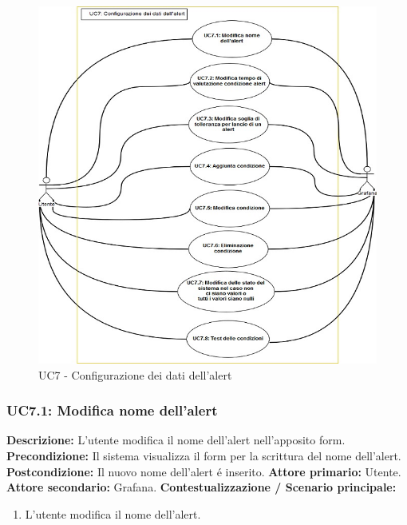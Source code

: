         \begin{figure}[!htbp]
                    	\centering
                    	\includegraphics[width=\textwidth]{UC7.png}
                    	\caption{UC7 - Configurazione dei dati dell'alert}
                    	\label{uc7}
                    \end{figure} 
                
                \subsubsection{UC7.1: Modifica nome dell'alert}
                    \textbf{Descrizione:} L’utente modifica il nome dell'alert nell'apposito form.
                    \newline
                    \textbf{Precondizione:} Il sistema visualizza il form per la scrittura del nome dell'alert.
                    \newline
                    \textbf{Postcondizione:} Il nuovo nome dell'alert é inserito.
                    \newline
                    \textbf{Attore primario:} Utente.
                    \newline
                    \textbf{Attore secondario:} Grafana.
                    \newline
                    \textbf{Contestualizzazione / Scenario principale:} \begin{enumerate}
                            \item L’utente modifica il nome dell'alert.
                        \end{enumerate}
                        
